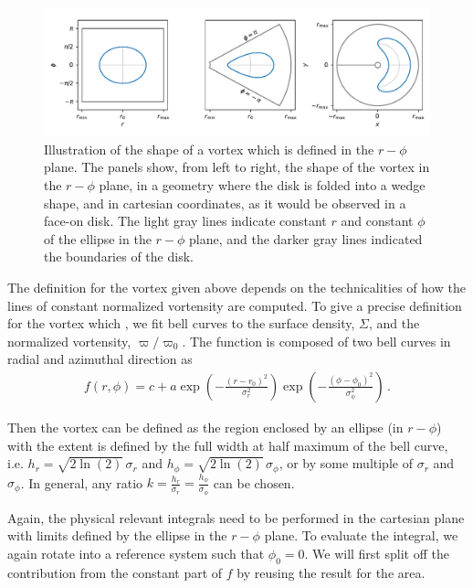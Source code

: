 \documentclass[a4paper]{scrartcl}
\begin{document}
\begin{figure}
  \begin{center}
    \includegraphics[width=\textwidth]{geometries.pdf}
    \caption{\label{fig:geometries}Illustration of the shape of a vortex which is defined in the $r-\phi$ plane.
    The panels show, from left to right, the shape of the vortex in the $r-\phi$ plane, 
    in a geometry where the disk is folded into a wedge shape, 
    and in cartesian coordinates, as it would be observed in a face-on disk.
    The light gray lines indicate constant $r$ and constant $\phi$ of the ellipse in the $r-\phi$ plane,
    and the darker gray lines indicated the boundaries of the disk.}
  \end{center}
\end{figure}

The definition for the vortex given above depends on the technicalities of how 
the lines of constant normalized vortensity are computed.
To give a precise definition for the vortex which , we fit bell curves to the surface density, $\Sigma$,
and the normalized vortensity, $\varpi/\varpi_0$.
The function is composed of two bell curves in radial and azimuthal direction as
\begin{align}
  f(r, \phi) = c + a \exp\left( - \frac{(r - r_0)^2}{\sigma_r^2} \right) \exp\left( - \frac{(\phi - \phi_0)^2}{\sigma_\phi^2} \right)\,.
\end{align}

Then the vortex can be defined as the region enclosed by an ellipse (in $r-\phi$)
with the extent is defined by the full width at half maximum of the bell curve, i.e. $h_r = \sqrt{2 \ln(2)} \,\sigma_r$
and $h_\phi = \sqrt{2 \ln(2)} \, \sigma_\phi$, or by some multiple of $\sigma_r$ and $\sigma_\phi$.
In general, any ratio $k = \frac{h_r}{\sigma_r} = \frac{h_\phi}{\sigma_\phi}$ can be chosen.

Again, the physical relevant integrals need to be performed in the cartesian plane with limits defined by
the ellipse in the $r-\phi$ plane.
To evaluate the integral, we again rotate into a reference system such that $\phi_0 = 0$.
We will first split off the contribution from the constant part of $f$ by reusing the result for the area.
\end{document}
